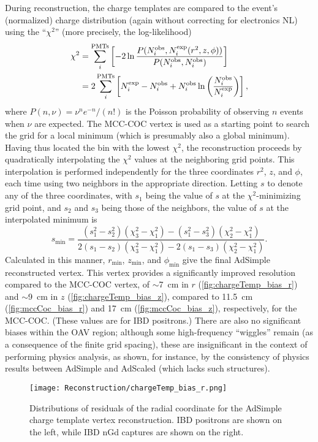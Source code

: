 \documentclass[../thesis.tex]{subfiles}
\begin{document}
During reconstruction, the charge templates are compared to the event's (normalized) charge distribution (again without correcting for electronics NL) using the ``$\chi^2$'' (more precisely, the log-likelihood)
\begin{align*}
  \chi^2 &= \sum_i^{\mathrm{PMTs}}\left[ -2 \ln \frac{P(N_i^{\mathrm{obs}}, N_i^{\mathrm{exp}}(r^2, z, \phi))}
        {P(N_i^{\mathrm{obs}}, N_i^{\mathrm{obs}})} \right] \\
      &= 2 \sum_i^{\mathrm{PMTs}} \left[ N_i^{\mathrm{exp}} - N_i^{\mathrm{obs}}+ N_i^{\mathrm{obs}} \ln \left( \frac{N_i^{\mathrm{obs}}}{N_i^{\mathrm{exp}}} \right) \right],
\end{align*}
where $P(n, \nu) = \nu^n e^{-n} / (n!)$ is the Poisson probability of observing $n$ events when $\nu$ are expected. The MCC-COC vertex is used as a starting point to search the grid for a local minimum (which is presumably also a global minimum). Having thus located the bin with the lowest $\chi^2$, the reconstruction proceeds by quadratically interpolating the $\chi^2$ values at the neighboring grid points. This interpolation is performed independently for the three coordinates $r^2$, $z$, and $\phi$, each time using two neighbors in the appropriate direction. Letting $s$ to denote any of the three coordinates, with $s_1$ being the value of $s$ at the $\chi^2$-minimizing grid point, and $s_2$ and $s_3$ being those of the neighbors, the value of $s$ at the interpolated minimum is
\begin{equation}
  s_{\mathrm{min}} = \frac{(s_1^2 - s_2^2)(\chi_3^2 - \chi_1^2) - (s_1^2 - s_3^2)(\chi_2^2 - \chi_1^2)}{2(s_1 - s_2)(\chi_3^2 - \chi_1^2) - 2(s_1 - s_3)(\chi_2^2 - \chi_1^2)}.
\end{equation}
Calculated in this manner, $r_{\mathrm{min}}$, $z_{\mathrm{min}}$, and $\phi_{\mathrm{min}}$ give the final AdSimple reconstructed vertex. This vertex provides a significantly improved resolution compared to the MCC-COC vertex, of $\sim$7~cm in $r$ (\autoref{fig:chargeTemp_bias_r}) and $\sim$9~cm in $z$ (\autoref{fig:chargeTemp_bias_z}), compared to 11.5~cm (\autoref{fig:mccCoc_bias_r}) and 17~cm (\autoref{fig:mccCoc_bias_z}), respectively, for the MCC-COC. (These values are for IBD positrons.) There are also no significant biases within the OAV region; although some high-frequency ``wiggles'' remain (as a consequence of the finite grid spacing), these are insignificant in the context of performing physics analysis, as shown, for instance, by the consistency of physics results between AdSimple and AdScaled (which lacks such structures).

\begin{figure}[h]
  \texttt{[image: Reconstruction/chargeTemp\_bias\_r.png]}
  \caption{Distributions of residuals of the radial coordinate for the AdSimple charge template vertex reconstruction. IBD positrons are shown on the left, while IBD nGd captures are shown on the right.}
  \label{fig:chargeTemp_bias_r}
\end{figure}
\end{document}
